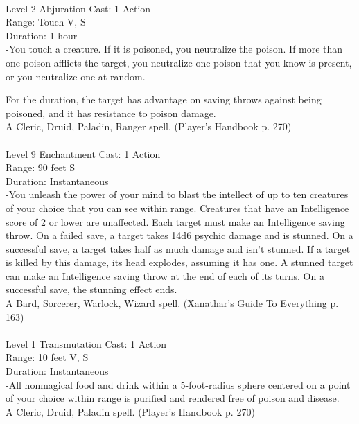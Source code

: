 \documentclass[10pt,twocolumn]{report}
\begin{document}
 \\
Level 2 \quad Abjuration \quad Cast: 1 Action\\
Range: Touch \quad V, S\\
Duration: 1 hour \quad \\
-You touch a creature. If it is poisoned, you neutralize the poison. If more than one poison afflicts the target, you neutralize one poison that you know is present, or you neutralize one at random.

For the duration, the target has advantage on saving throws against being poisoned, and it has resistance to poison damage.\\
A Cleric, Druid, Paladin, Ranger spell. (Player's Handbook p. 270) \\


 \\
Level 9 \quad Enchantment \quad Cast: 1 Action\\
Range: 90 feet \quad S\\
Duration: Instantaneous \quad \\
-You unleash the power of your mind to blast the intellect of up to ten creatures of your choice that you can see within range. Creatures that have an Intelligence score of 2 or lower are unaffected.
Each target must make an Intelligence saving throw. On a failed save, a target takes 14d6 psychic damage and is stunned. On a successful save, a target takes half as much damage and isn’t stunned. If a target is killed by this damage, its head explodes, assuming it has one.
A stunned target can make an Intelligence saving throw at the end of each of its turns. On a successful save, the stunning effect ends.\\
A Bard, Sorcerer, Warlock, Wizard spell. (Xanathar's Guide To Everything p. 163) \\


 \\
Level 1 \quad Transmutation \quad Cast: 1 Action\\
Range: 10 feet \quad V, S\\
Duration: Instantaneous \quad \\
-All nonmagical food and drink within a 5-foot-radius sphere centered on a point of your choice within range is purified and rendered free of poison and disease.\\
A Cleric, Druid, Paladin spell. (Player's Handbook p. 270) \\
\end{document}
